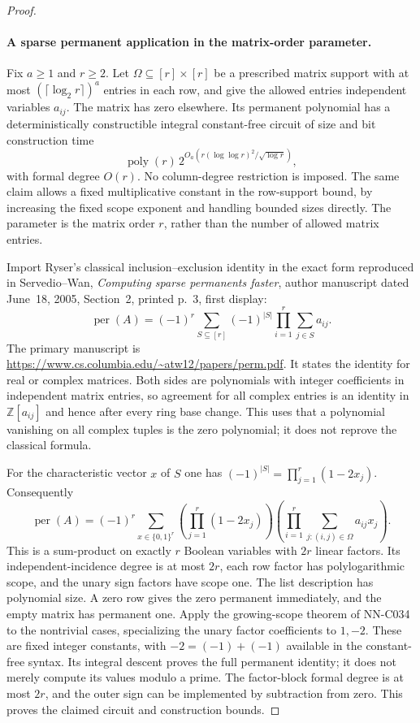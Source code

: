 \begin{proof}
\paragraph{A sparse permanent application in the matrix-order parameter.}
Fix $a\ge1$ and $r\ge2$.  Let $\Omega\subseteq[r]\times[r]$ be a prescribed
matrix support with at most $(\lceil\log_2 r\rceil)^a$ entries in
each row, and give the allowed entries independent variables
$a_{ij}$.  The matrix has zero elsewhere.  Its permanent polynomial
has a deterministically constructible integral constant-free circuit
of size and bit construction time
\[
 \operatorname{poly}(r)\,
       2^{O_a(r(\log\log r)^2/\sqrt{\log r})},
\]
with formal degree $O(r)$.  No column-degree restriction is imposed.
The same claim allows a fixed multiplicative constant in the
row-support bound, by increasing the fixed scope exponent and
handling bounded sizes directly.  The parameter is the matrix
order $r$, rather than the number of allowed matrix entries.

Import Ryser's classical inclusion--exclusion identity in the
exact form reproduced in Servedio--Wan, \emph{Computing sparse
permanents faster}, author manuscript dated June~18, 2005,
Section~2, printed p.~3, first display:
\[
 \operatorname{per}(A)=(-1)^r\sum_{S\subseteq[r]}(-1)^{|S|}
                          \prod_{i=1}^r\sum_{j\in S}a_{ij}.
\]
The primary manuscript is
\url{https://www.cs.columbia.edu/~atw12/papers/perm.pdf}.
It states the identity for real or complex matrices.  Both sides
are polynomials with integer coefficients in independent matrix
entries, so agreement for all complex entries is an identity in
$\mathbb Z[a_{ij}]$ and hence after every ring base change.
This uses that a polynomial vanishing on all complex tuples is
the zero polynomial; it does not reprove the classical formula.

For the characteristic vector $x$ of $S$ one has
$(-1)^{|S|}=\prod_{j=1}^r(1-2x_j)$.  Consequently
\[
 \operatorname{per}(A)=(-1)^r
 \sum_{x\in\{0,1\}^r}
       \left(\prod_{j=1}^r(1-2x_j)\right)
       \left(\prod_{i=1}^r\sum_{j:(i,j)\in\Omega}a_{ij}x_j\right).
\]
This is a sum-product on exactly $r$ Boolean variables with $2r$
linear factors.  Its independent-incidence degree is at most
$2r$, each row factor has polylogarithmic scope, and the unary
sign factors have scope one.  The list description has polynomial
size.  A zero row gives the zero permanent immediately, and the
empty matrix has permanent one.  Apply the growing-scope theorem
of NN-C034 to the nontrivial cases, specializing the unary factor
coefficients to $1,-2$.  These are fixed integer constants, with
$-2=(-1)+(-1)$ available in the constant-free syntax.  Its integral
descent proves the full permanent identity; it does not merely
compute its values modulo a prime.  The factor-block formal degree
is at most $2r$, and the outer sign can be implemented by subtraction
from zero.  This proves the claimed circuit and construction bounds.


\end{proof}
